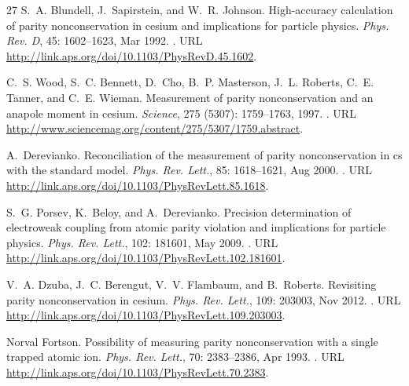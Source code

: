 \documentclass[%
 reprint,
 amsmath,amssymb,
 aps,
]{revtex4-1}
\begin{document}
\begin{thebibliography}{27}
S.~A. Blundell, J.~Sapirstein, and W.~R. Johnson.
\newblock High-accuracy calculation of parity nonconservation in cesium and
  implications for particle physics.
\newblock \emph{Phys. Rev. D}, 45: 1602--1623, Mar 1992.
\newblock {}.
\newblock URL \url{http://link.aps.org/doi/10.1103/PhysRevD.45.1602}.

C.~S. Wood, S.~C. Bennett, D.~Cho, B.~P. Masterson, J.~L. Roberts, C.~E.
  Tanner, and C.~E. Wieman.
\newblock Measurement of parity nonconservation and an anapole moment in
  cesium.
\newblock \emph{Science}, 275 (5307): 1759--1763, 1997.
\newblock {}.
\newblock URL \url{http://www.sciencemag.org/content/275/5307/1759.abstract}.

A.~Derevianko.
\newblock Reconciliation of the measurement of parity nonconservation in cs
  with the standard model.
\newblock \emph{Phys. Rev. Lett.}, 85: 1618--1621, Aug 2000.
\newblock {}.
\newblock URL \url{http://link.aps.org/doi/10.1103/PhysRevLett.85.1618}.

S.~G. Porsev, K.~Beloy, and A.~Derevianko.
\newblock Precision determination of electroweak coupling from atomic parity
  violation and implications for particle physics.
\newblock \emph{Phys. Rev. Lett.}, 102: 181601, May 2009.
\newblock {}.
\newblock URL \url{http://link.aps.org/doi/10.1103/PhysRevLett.102.181601}.

V.~A. Dzuba, J.~C. Berengut, V.~V. Flambaum, and B.~Roberts.
\newblock Revisiting parity nonconservation in cesium.
\newblock \emph{Phys. Rev. Lett.}, 109: 203003, Nov 2012.
\newblock {}.
\newblock URL \url{http://link.aps.org/doi/10.1103/PhysRevLett.109.203003}.

Norval Fortson.
\newblock Possibility of measuring parity nonconservation with a single trapped
  atomic ion.
\newblock \emph{Phys. Rev. Lett.}, 70: 2383--2386, Apr 1993.
\newblock {}.
\newblock URL \url{http://link.aps.org/doi/10.1103/PhysRevLett.70.2383}.


\end{thebibliography}
\end{document}
